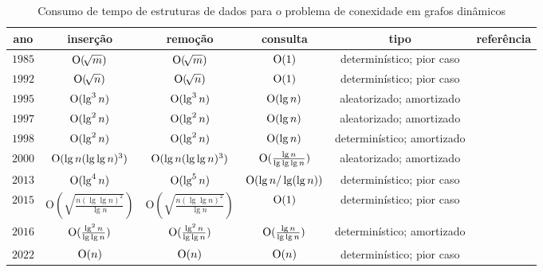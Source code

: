 \begin{table}[h!]
\centering
\begin{tabular}{||c | c | c | c | c | c||} 
 \hline
 ano & inserção & remoção & consulta & tipo & referência \\ [0.5ex] 
 \hline\hline
  $1985$ & $\mathrm{O}(\!\sqrt{m})$ & $\mathrm{O}(\!\sqrt{m})$ & $\mathrm{O}(1)$  & determinístico; pior caso& \cite{frederickson1983data} \\ 
 \hline
  $1992$ & $\mathrm{O}(\!\sqrt{n})$ & $\mathrm{O}(\!\sqrt{n})$ & $\mathrm{O}(1)$  & determinístico; pior caso& \cite{Eppstein1992SparsificationaTF} \\ 
 \hline
  $1995$ & $\mathrm{O}(\lg^3 n)$ & $\mathrm{O}(\lg^3 n)$   & $\mathrm{O}(\lg n)$  & aleatorizado; amortizado & \cite{HenzingerKing} \\ 
 \hline
  $1997$ & $\mathrm{O}(\lg^2 n)$ & $\mathrm{O}(\lg^2 n)$   & $\mathrm{O}(\lg n)$  & aleatorizado; amortizado & \cite{HenzingerThorup} \\ 
 \hline
  $1998$ & $\mathrm{O}(\lg^2 n)$ & $\mathrm{O}(\lg^2 n)$   & $\mathrm{O}(\lg n)$  & determinístico; amortizado & \cite{poly_log} \\ 
 \hline
  $2000$ & $\mathrm{O}(\lg n(\lg  \lg n)^3)$ &  $\mathrm{O}(\lg n(\lg \lg n)^3)$      & $\mathrm{O}(\frac{\lg n}{\lg\lg\lg n})$  & aleatorizado; amortizado & \cite{Thorup2000} \\ 
 \hline
  $2013$ & $\mathrm{O}(\lg^4 n)$ & $\mathrm{O}(\lg^5 n)$ & $\mathrm{O}(\lg n / \lg(\lg n))$ & determinístico; pior caso& \cite{bruceM} \\
 \hline
  $2015$ & $ \mathrm{O}\!\left(\sqrt{\frac{n\left(\lg \lg n\right)^2}{\lg n}}\right)  $ & $\mathrm{O}\!\left(\sqrt{\frac{n\left(\lg \lg n\right)^2}{\lg n}}\right)$ & $\mathrm{O}(1)$ & determinístico; pior caso& \cite{kejlbergrasmussen_et_al} \\
 \hline
  $2016$ & $\mathrm{O}(  \frac{\lg^2 n}{\lg \lg n})$ & $\mathrm{O}( \frac{\lg^2 n}{\lg \lg n}) $   & $\mathrm{O}( \frac{\lg n}{\lg \lg n}) $  & determinístico; amortizado & \cite{Wulff-Nilsen2016} \\ 
 \hline
  $2022$ & $\mathrm{O}(n)$ & $\mathrm{O}(n) $   & $\mathrm{O}(n) $  & determinístico; pior caso  & \cite{QC22} \\ 
 \hline
\end{tabular}
\caption{Consumo de tempo de estruturas de dados para o problema de conexidade em grafos dinâmicos}
\label{table:1}
\end{table}
